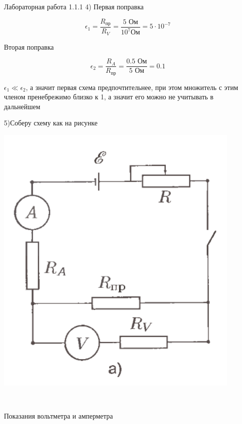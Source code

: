\documentclass{astroedu-lab}
\begin{document}
\begin{problem}{\large Лабораторная работа 1.1.1}
4)
Первая поправка

\begin{equation}
	\epsilon_1 = \frac{R_{\text{пр}}}{R_V} = \frac{5 \text{ Ом}}{10^7 \text{Ом}} = 5 \cdot 10^{-7}
\end{equation}

Вторая поправка

\begin{equation}
	\epsilon_2 = \frac{R_A}{R_{\text{пр}}} = \frac{0.5 \text{ Ом}}{5 \text{ Ом}} = 0.1
\end{equation}

$\epsilon_1 \ll \epsilon_2$, а значит первая схема предпочтительнее, при этом множитель с этим членом пренебрежимо близко к 1, а значит его можно не учитывать в дальнейшем

\newpage

5)Соберу схему как на рисунке

\begin{center}

\includegraphics[width=0.3\linewidth]{pic_1.png}

\label{fig:mpr}

\end{center}
\

Показания вольтметра и амперметра


\end{problem}
\end{document}
